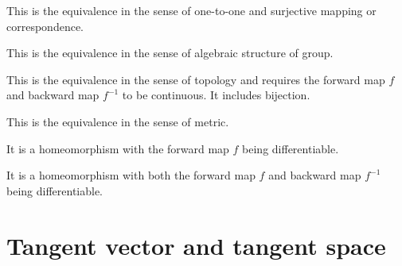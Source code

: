 \documentclass[11pt, a4paper]{book}
\begin{document}
\begin{Definition}[Bijection]
  This is the equivalence in the sense of one-to-one and surjective  mapping or correspondence.
\end{Definition}

\begin{Definition}[Isomorphism]
  This is the equivalence in the sense of algebraic structure of group.
\end{Definition}

\begin{Definition}[Homeomorphism]
  This is the equivalence in the sense of topology and requires the
  forward map $f$ and backward map $f^{-1}$ to be continuous. It
  includes bijection.
\end{Definition}

\begin{Definition}[Isometry]
  This is the equivalence in the sense of metric.
\end{Definition}

\begin{Definition}
  It is a homeomorphism with the forward map $f$ being differentiable.
\end{Definition}

\begin{Definition}[Diffeomorphism]
  It is a homeomorphism with both the forward map $f$ and backward map
  $f^{-1}$ being differentiable.
\end{Definition}

\section{Tangent vector and tangent space}
\end{document}

